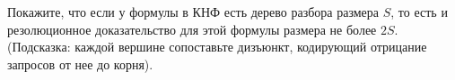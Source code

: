 Покажите, что если у формулы в КНФ есть дерево разбора размера $S$, то есть и резолюционное доказательство для этой формулы
размера не более $2S$. (Подсказка: каждой вершине сопоставьте дизъюнкт, кодирующий отрицание запросов от нее до корня).
